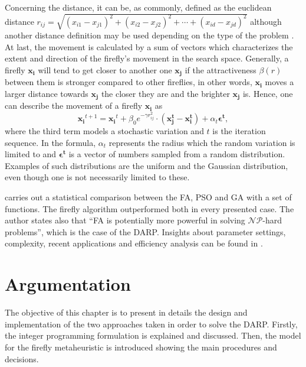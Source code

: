 \documentclass[tuberlin,cic,tc,openright,english,noabntcite,oneside]{iiufrgs}
\begin{document}
Concerning the distance, it can be, as commonly, defined as the euclidean distance $r_{ij} = \sqrt{(x_{i1} - x_{j1})^{2}+(x_{i2} - x_{j2})^{2}+\cdots+(x_{id} - x_{jd})^{2}}$ although another distance definition may be used depending on the type of the problem \parencite[p. 193]{yang_efficiency_2012}. At last, the movement is calculated by a sum of vectors which characterizes the extent and direction of the firefly's movement in the search space. Generally, a firefly $\mathbf{x_i}$ will tend to get closer to another one $\mathbf{x_j}$ if the attractiveness $\beta(r)$ between them is stronger compared to other fireflies, in other words, $\mathbf{x_i}$ moves a larger distance towards $\mathbf{x_j}$ the closer they are and the brighter $\mathbf{x_j}$ is. Hence, one can describe the movement of a firefly $\mathbf{x_i}$ as
$$\mathbf{x_i}^{t+1} = \mathbf{x_i}^{t} + \beta_{0}e^{-\gamma r_{ij}^{2}} \cdot (\mathbf{x^{t}_j} - \mathbf{x^{t}_i}) + \alpha_{t} \mathbf{\epsilon^{t}},$$
where the third term models a stochastic variation and $t$ is the iteration sequence. In the formula, $\alpha_t$ represents the radius which the random variation is limited to and $\mathbf{\epsilon^{t}}$ is a vector of numbers sampled from a random distribution. Examples of such distributions are the uniform and the Gaussian distribution, even though one is not necessarily limited to these.

\textcite[p. 177]{yang_firefly_2009} carries out a statistical comparison between the FA, PSO and GA with a set of functions. The firefly algorithm outperformed both in every presented case. The author states also that \enquote{FA is potentially more powerful in solving $\mathcal{NP}$-hard problems}, which is the case of the DARP. Insights about parameter settings, complexity, recent applications and efficiency analysis can be found in \textcite{yang_firefly_2013}.

\chapter{Argumentation}
The objective of this chapter is to present in details the design and implementation of the two approaches taken in order to solve the DARP. Firstly, the integer programming formulation is explained and discussed. Then, the model for the firefly metaheuristic is introduced showing the main procedures and decisions.
\end{document}
